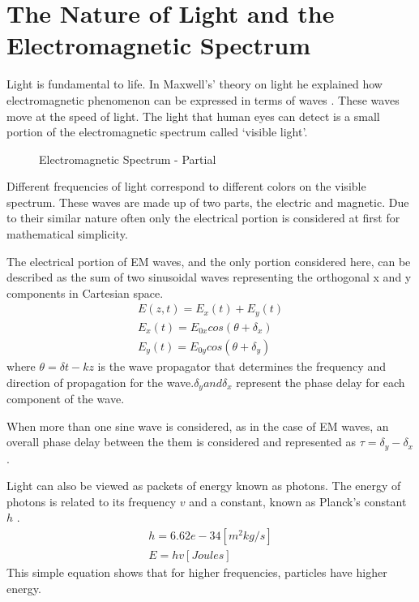 \section{The Nature of Light and the Electromagnetic Spectrum}
Light is fundamental to life.  In Maxwell’s’ theory on light he explained how electromagnetic phenomenon can be expressed in terms of waves \cite{maxwell}.  These waves move at the speed of light.  The light that human eyes can detect is a small portion of the electromagnetic spectrum called ‘visible light’.
%
\begin{figure}[!htb]
    \begin{center}
    \end{center}
    \caption{Electromagnetic Spectrum - Partial}
    \label{fig:polarization}
\end{figure}
Different frequencies of light correspond to different colors on the visible spectrum.  These waves are made up of two parts, the electric and magnetic.  Due to their similar nature often only the electrical portion is considered at first for mathematical simplicity.

The electrical portion of EM waves, and the only portion considered here, can be described as the sum of two sinusoidal waves representing the orthogonal x and y components in Cartesian space.
%
\begin{align}
    E(z,t)=E_x (t)+E_y (t)\\
    E_x (t)=E_{0x} cos( \theta+\delta_x )\\
    E_y (t)=E_{0y} cos( \theta+\delta_y )
\end{align}
%
where $ \theta = \delta t-kz $ is the wave propagator that determines the frequency and direction of propagation for the wave.$ \delta_y and \delta_x $ represent the phase delay for each component of the wave.

When more than one sine wave is considered, as in the case of EM waves, an overall phase delay between the them is considered and represented as $ \tau=\delta_y-\delta_x $.

Light can also be viewed as packets of energy known as photons.  The energy of photons is related to its frequency $v$ and a constant, known as Planck’s constant $h$ \cite{ecophysiology}.
%
\begin{align}
	h=6.62e-34 [m^2 kg/s]\\
	E=hv [Joules]
\end{align}
%
This simple equation shows that for higher frequencies, particles have higher energy.






